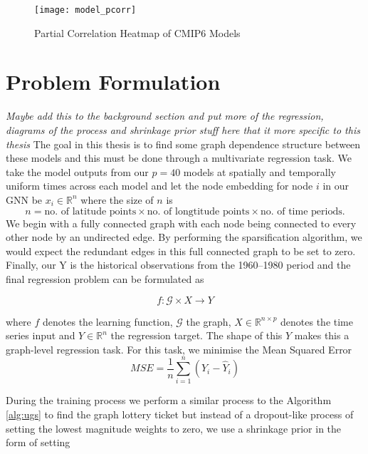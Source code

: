 \documentclass[honours,12pt]{unswthesis}
\newcommand{\R}{\mathbb{R}}
\numberwithin{equation}{section}
\begin{document}
\begin{figure}[H]
    \centering
    \texttt{[image: model\_pcorr]}
    \caption{Partial Correlation Heatmap of CMIP6 Models}
\label{fig:pcorr_plot}
\end{figure}


{\section{Problem Formulation}}\label{problem-formulation}
\textit{Maybe add this to the background section and put more of the regression, diagrams of the process and shrinkage prior stuff here that it more specific to this thesis}
{\noindent}The goal in this thesis is to find some graph dependence structure between these models and this must be done through a multivariate regression task.
We take the model outputs from our $p = 40$ models at spatially and temporally uniform times across each model and let the node embedding for node $i$ in our GNN be $x_i \in \R^{n}$ 
where the size of $n$ is \[n = \text{no. of latitude points} \times \text{no. of longtitude points} \times \text{no. of time periods}.\]
We begin with a fully connected graph with each node being connected to every other node by an undirected edge.
By performing the sparsification algorithm, we would expect the redundant edges in this full connected graph to be set to zero. 
Finally, our Y is the historical observations from the 1960--1980 period and the final regression problem can be formulated as

\begin{equation}
f : \mathcal{G} \times X \rightarrow Y
\end{equation}

\noindent where $f$ denotes the learning function, $\mathcal{G}$ the graph, $X \in \R^{n \times p}$ denotes the time series input and $Y \in \R^n$ the regression target.
The shape of this $Y$ makes this a graph-level regression task. For this task, we minimise the Mean Squared Error 
$$ MSE = \frac{1}{n} \sum_{i=1}^{n} (Y_i - \hat{Y}_i)$$

{\noindent}During the training process we perform a similar process to the Algorithm \ref{alg:ugs} to find the graph lottery ticket but instead of a dropout-like process
of setting the lowest magnitude weights to zero, we use a shrinkage prior in the form of setting

    
\end{document}
